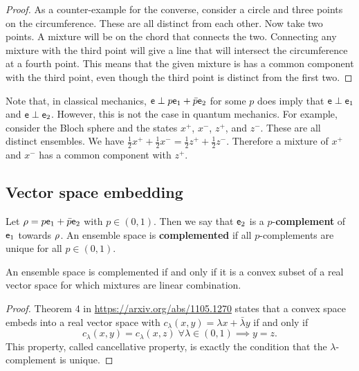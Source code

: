 \begin{proof}
	As a counter-example for the converse, consider a circle and three points on the circumference. These are all distinct from each other. Now take two points. A mixture will be on the chord that connects the two. Connecting any mixture with the third point will give a line that will intersect the circumference at a fourth point. This means that the given mixture is has a common component with the third point, even though the third point is distinct from the first two.	
\end{proof}

\begin{remark}
	Note that, in classical mechanics, $\ens \distinct p \ens_1 + \bar{p} \ens_2$ for some $p$ does imply that $\ens \distinct \ens_1$ and $\ens \distinct \ens_2$. However, this is not the case in quantum mechanics. For example, consider the Bloch sphere and the states $x^+$, $x^-$, $z^+$, and $z^-$. These are all distinct ensembles. We have $\frac{1}{2} x^+ + \frac{1}{2} x^- = \frac{1}{2} z^+ + \frac{1}{2} z^-$. Therefore a mixture of $x^+$ and $x^-$ has a common component with $z^+$.
\end{remark}

\subsection{Vector space embedding}

\begin{defn}
	 Let $\ens[\rho] = p \ens_1 + \bar{p} \ens_2$ with $p \in (0,1)$. Then we say that $\ens_2$ is a $p$-\textbf{complement} of $\ens_1$ towards $\ens[\rho]$. An ensemble space is \textbf{complemented} if all $p$-complements are unique for all $p \in (0, 1)$.
\end{defn}

\begin{prop}\label{pm_es_complementedIsVectorSpace}
	An ensemble space is complemented if and only if it is a convex subset of a real vector space for which mixtures are linear combination.
\end{prop}

\begin{proof}
	Theorem 4 in \url{https://arxiv.org/abs/1105.1270} states that a convex space embeds into a real vector space with $c_\lambda(x,y) = \lambda x + \bar{\lambda}y$ if and only if
	$$ c_\lambda(x,y) = c_\lambda(x,z) \; \forall \lambda \in (0,1) \implies y = z.$$ This property, called cancellative property, is exactly the condition that the $\lambda$-complement is unique.
\end{proof}

